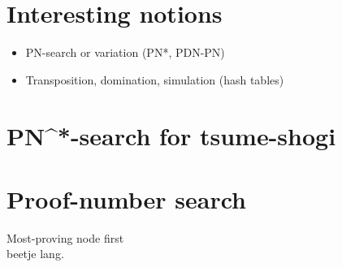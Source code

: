 \documentclass{article}
\begin{document}
\section{Interesting notions}
\begin{itemize}
\item PN-search or variation (PN*, PDN-PN)
\item Transposition, domination, simulation (hash tables)

\end{itemize}

\section{PN^*-search for tsume-shogi}



\section{Proof-number search}
Most-proving node first\\
beetje lang.
\end{document}
